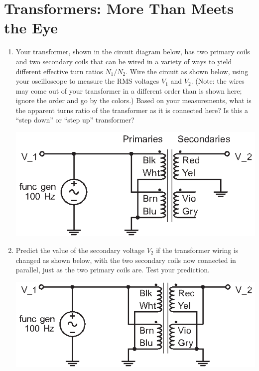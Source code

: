 \section{Transformers: More Than Meets the Eye}
\label{lab_transformers}


\bigskip

\begin{enumerate}[wide]

\item Your transformer, shown in the circuit diagram below, has two primary coils and two secondary coils that can be wired in a variety of ways to yield different effective turn ratios $N_1/N_2$.  Wire the circuit as shown below, using your oscilloscope to measure the RMS voltages $V_1$ and $V_2$.  (Note: the wires may come out of your transformer in a different order than is shown here; ignore the order and go by the colors.)  Based on your measurements, what is the apparent turns ratio of the transformer as it is connected here?  Is this a ``step down'' or ``step up'' transformer?  

\begin{center}
\includegraphics{transformers/transformer_par_single.eps}
\end{center}

\item Predict the value of the secondary voltage $V_2$ if the transformer wiring is changed as shown below, with the two secondary coils now connected in parallel, just as the two primary coils are.  Test your prediction.

\begin{center}
\includegraphics{transformers/transformer_par_par.eps}
\end{center}


\end{enumerate}
